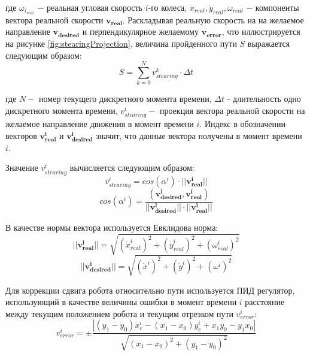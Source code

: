 \documentclass[oneside,final,14pt]{extreport}
\newcommand{\bs}{\boldsymbol}
\begin{document}
где $\omega_{i_{real}}$ $-$ реальная угловая скорость $i$-го  колеса, $\dot{x}_{real},
\dot{y}_{real},
\omega_{real}$ $-$ компоненты вектора реальной скорости $\bs{v_{real}}$. 
Раскладывая реальную скорость на на желаемое направление $\bs{v_{desired}}$ и перпендикулярное желаемому $\bs{v_{error}}$, что иллюстрируется на рисунке \ref{fig:stearingProjection}, величина пройденного пути $S$ выражается следующим образом:
\begin{equation}
S
=
\sum\limits_{k=0}^N v_{stearing}^k
\cdot
\Delta t
\end{equation}

где $N -$ номер текущего дискретного момента времени, $\Delta t$ - длительность одно дискретного момента времени, $ v_{stearing}^i -$ проекция вектора реальной скорости на желаемое направление движения в момент времени $i$. Индекс в обозначении векторов $\bs{v_{real}^i}$ и $\bs{v_{desired}^i}$ значит, что данные вектора получены в момент времени $i$.

\begin{figure}[H]
\end{figure}

  Значение $v_{stearing}^i$ вычисляется следующим образом:  
\begin{equation}
v_{stearing}^i
=
cos(\alpha^i)
\cdot
||\bs{v_{real}^i}||
\end{equation}
\begin{equation}
cos(\alpha^i)
=
\frac{
(\bs{v_{desired}^i},\bs{v_{real}^i})
}
{
||\bs{v_{desired}^i}||
\cdot
||\bs{v_{real}^i}||
}
\end{equation}

В качестве нормы вектора используется Евклидова норма:
\begin{equation}
||\bs{v_{real}^i}||
=
\sqrt{ 
	(\dot{x}_{real}^i)^2 
	+ 
	(\dot{y}_{real}^i)^2
	+
	(\omega_{real}^i)^2
	}	
\end{equation}
\begin{equation}
||\bs{v_{desired}^i}||
=
\sqrt{ 
	(\dot{x}^i)^2 
	+ 
	(\dot{y}^i)^2
	+
	(\omega^i)^2
	}	
\end{equation}

Для коррекции сдвига  робота относительно пути используется ПИД регулятор, использующий в качестве величины ошибки в момент времени $i$ расстояние между текущим положением робота и текущим отрезком пути  $v_{error}^i$:
\begin{equation}
v_{error}^i
=
\pm
\frac{
|
(y_1 - y_0)x_c^i
-
(x_1 - x_0)y_c^i
+
x_1 y_0
-
y_1 x_0
|
}
{
\sqrt{
(x_1 - x_0)^2
+
(y_1 - y_0)^2
}
}
\end{equation}
\end{document}
